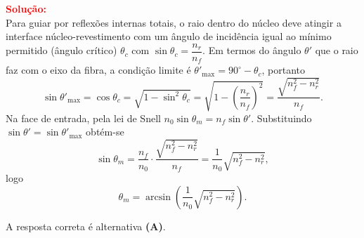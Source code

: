 \documentclass[a4paper,12pt]{article}
\begin{document}
\begin{flushleft}
\vspace{0.5cm}

\textcolor{red}{\textbf{Solução:}}\\

Para guiar por reflexões internas totais, o raio dentro do núcleo deve atingir a interface núcleo-revestimento com um ângulo de incidência 
igual ao mínimo permitido (ângulo crítico) \(\theta_c\) com \(\sin\theta_c=\dfrac{n_r}{n_f}\). Em termos do ângulo \(\theta'\) que o raio faz 
com o eixo da fibra, a condição limite é \(\theta'_{\max}=90^\circ-\theta_c\), portanto
\[
\sin\theta'_{\max}=\cos\theta_c=\sqrt{1-\sin^2\theta_c}=\sqrt{1-\left(\frac{n_r}{n_f}\right)^2}=\frac{\sqrt{n_f^2-n_r^2}}{n_f}.
\]
Na face de entrada, pela lei de Snell \(n_0\sin\theta_m=n_f\sin\theta'\). Substituindo \(\sin\theta'=\sin\theta'_{\max}\) obtém-se
\[
\sin\theta_m=\frac{n_f}{n_0}\cdot\frac{\sqrt{n_f^2-n_r^2}}{n_f}=\frac{1}{n_0}\sqrt{n_f^2-n_r^2},
\]
logo
\[
\theta_m=\arcsin\!\left(\frac{1}{n_0}\sqrt{n_f^2-n_r^2}\right).
\]

A resposta correta é alternativa \colorbox{green!50}{\textbf{(A)}}.

\end{flushleft}
\end{document}
